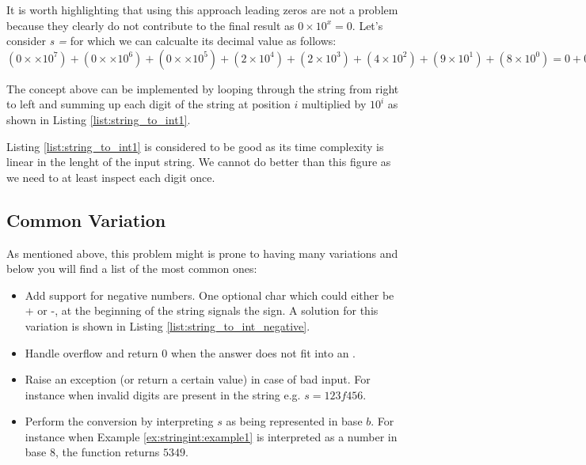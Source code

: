It is worth highlighting that using this approach leading zeros are not a problem because they clearly do not contribute to the final result as $0 \times 10^x = 0$. Let's consider \textit{s =} for which we can calcualte its decimal value as follows:  $(0 \times \times 10^7) + (0 \times \times 10^6) + (0 \times \times 10^5) + (2 \times 10^4) + (2 \times 10^3) + (4 \times 10^2) + (9 \times 10^1) + (8 \times 10^0) = 0+0+0+20000 + 2000 + 400 +90 +8 = 22498$

The concept above can be implemented by looping through the string from right to left and summing up each digit of the string at position $i$  multiplied by $10^i$ as shown in Listing \ref{list:string_to_int1}.



Listing \ref{list:string_to_int1} is considered to be good as its time complexity is linear in the lenght of the input string. We cannot do better than this figure as we need to at least inspect each digit once.

\subsection{Common Variation}
As mentioned above, this problem might is prone to having many variations and below you will find a list of the most common ones: 
\begin{itemize}
	\item Add support for negative numbers. One optional char which could either be + or -, at the beginning of the string signals the sign. A solution for this variation is shown in Listing \ref{list:string_to_int_negative}.
	\item Handle overflow and return $0$ when the answer does not fit into an .
	\item Raise an exception (or return a certain value) in case of bad input. For instance when invalid digits are present in the string e.g. $s=123f456$.
	\item Perform the conversion by interpreting $s$ as being represented in base $b$. For instance when Example \ref{ex:stringint:example1} is interpreted as a number in base $8$, the function returns $5349$. 
\end{itemize}


